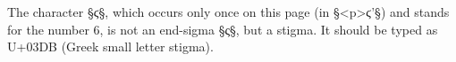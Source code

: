 
\begin{note}
The character §ϛ§, which occurs only once on this page (in §<p>ϛ'§) and stands for the number 6, is not an end-sigma §ς§, but a stigma. It should be typed as U+03DB (Greek small letter stigma).
\end{note}
